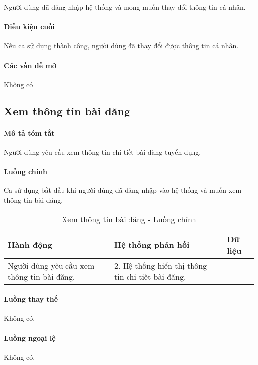 \documentclass[./../main.tex]{subfiles}
\begin{document}
Người dùng đã đăng nhập hệ thống và mong muốn thay đổi thông tin cá
nhân.

\paragraph*{Điều kiện cuối}

Nếu ca sử dụng thành công, người dùng đã thay đổi được thông tin cá
nhân.

\paragraph*{Các vấn đề mở}

Không có

\subsection{Xem thông tin bài đăng}

\paragraph*{Mô tả tóm tắt}

Người dùng yêu cầu xem thông tin chi tiết bài đăng tuyển dụng.

\paragraph*{Luồng chính} Ca sử dụng bắt đầu khi người dùng đã đăng nhập vào
hệ thống và muốn xem thông tin bài đăng.

\begin{table}[H]
  \caption{Xem thông tin bài đăng - Luồng chính}
  \label{tab:read_post}
  \begin{tabularx}{\textwidth}{|X|X|X|}
  \hline
  \textbf{Hành động}                         & \textbf{Hệ thống phản hồi}                        & \textbf{Dữ liệu} \\ \hline
  Người dùng yêu cầu xem thông tin bài đăng. & 2. Hệ thống hiển thị thông tin chi tiết bài đăng. &                  \\ \hline
  \end{tabularx}
\end{table}

\paragraph*{Luồng thay thế} Không có.

\paragraph*{Luồng ngoại lệ} Không có.
\end{document}
